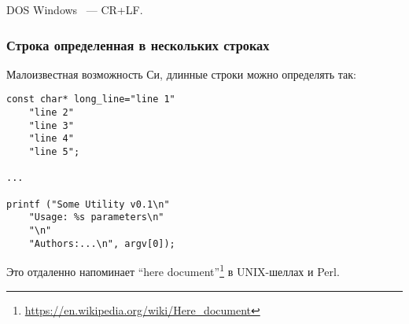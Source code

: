  DOS  Windows ~--- CR+LF.

\subsubsection{Строка определенная в нескольких строках}
\label{heredoc}
Малоизвестная возможность Си, длинные строки можно определять так:

\begin{lstlisting}
const char* long_line="line 1"
	"line 2"
	"line 3"
	"line 4"
	"line 5";

...

printf ("Some Utility v0.1\n"
	"Usage: %s parameters\n"
	"\n"
	"Authors:...\n", argv[0]);
\end{lstlisting}

Это отдаленно напоминает ``here document''\footnote{\url{https://en.wikipedia.org/wiki/Here_document}} в 
UNIX-шеллах и Perl.

